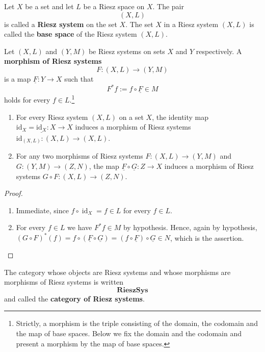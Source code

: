 \begin{definition}
  Let $X$ be a set and let $L$ be a Riesz space on $X$.
  The pair
  \[
    (X , L)
  \]
  is called a \textbf{Riesz system} on the set $X$.
  The set $X$ in a Riesz system $(X,L)$ is called the \textbf{base space} of the
  Riesz system $(X,L)$.
\end{definition}

\begin{definition}
  Let $(X,L)$ and $(Y,M)$ be Riesz systems on sets $X$ and $Y$
  respectively.
  A \textbf{morphism of Riesz systems}
  \[
    F:(X,L)\to(Y,M)
  \]
  is a map $\underline{F}:Y\to X$ such that
  \[
    F^*f:=f\circ\underline{F}\in M
  \]
  holds for every $f\in L$.\footnote{Strictly, a morphism is the triple
  consisting of the domain, the codomain and the map of base spaces. Below we fix
  the domain and the codomain and present a morphism by the map of base spaces.}
\end{definition}

\begin{lemma}
  \begin{enumerate}
    \item For every Riesz system $(X,L)$ on a set $X$, the identity map
      $\mathrm{id}_X=\underline{\mathrm{id}_X}:X\to X$ induces a morphism of
      Riesz systems $\mathrm{id}_{(X,L)}:(X,L)\to (X,L)$.
    \item For any two morphisms of Riesz systems $F:(X,L)\to(Y,M)$ and
      $G:(Y,M)\to(Z,N)$, the map $\underline{F}\circ\underline{G}:Z\to X$ induces
      a morphism of Riesz systems $G\circ F:(X,L)\to(Z,N)$.
  \end{enumerate}
\end{lemma}
\begin{proof}
  \begin{enumerate}
    \item Immediate, since $f\circ \operatorname{id}_X=f\in L$ for every $f\in L$.
    \item For every $f\in L$ we have $F^*f\in M$ by hypothesis. Hence, again by
      hypothesis,
      $(G\circ F)^*(f)=f\circ(\underline{F}\circ\underline{G})=(f\circ \underline{F})\circ\underline{G}\in N$,
      which is the assertion.
  \end{enumerate}
\end{proof}

\begin{definition}
  The category whose objects are Riesz systems and whose morphisms are morphisms
  of Riesz systems is written
  \[
    \mathbf{RieszSys}
  \]
  and called the \textbf{category of Riesz systems}.
\end{definition}
